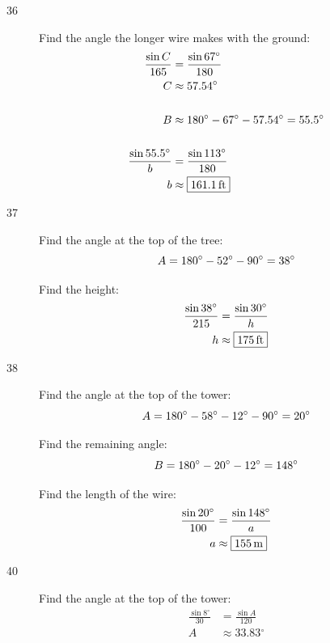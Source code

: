 \documentclass{exam}
\newcommand{\dg}{\ensuremath{^\circ}}
\begin{document}
\begin{description}
      \item[36] 
        Find the angle the longer wire makes with the ground:
        \begin{align*}
          \frac{\sin C}{165} & = \frac{\sin 67 \dg}{180} \\
          C                  & \approx 57.54 \dg \\
          \\
          B & \approx 180 \dg - 67 \dg - 57.54 \dg = 55.5 \dg \\
          \\
          \frac{\sin 55.5 \dg}{b} & = \frac{\sin 113 \dg}{180} \\
          b                       & \approx \boxed{\unit[161.1]{ft}} \\
        \end{align*}

      \item[37] 
        Find the angle at the top of the tree:
        \[
          A = 180 \dg - 52 \dg - 90 \dg = 38 \dg \\
        \]

        Find the height:
        \begin{align*}
          \frac{\sin 38 \dg}{215} & = \frac{\sin 30 \dg}{h} \\
          h                       & \approx \boxed{ \unit[175]{ft} } \\
        \end{align*}

      \item[38] 
        Find the angle at the top of the tower:
        \[
          A = 180 \dg - 58 \dg - 12 \dg - 90 \dg = 20 \dg \\
        \]

        Find the remaining angle:
        \[
          B = 180 \dg - 20 \dg - 12 \dg = 148 \dg \\
        \]

        Find the length of the wire:
        \begin{align*}
          \frac{\sin 20 \dg}{100} & = \frac{\sin 148 \dg}{a} \\
          a                       & \approx \boxed{ \unit[155]{m} } \\
        \end{align*}

      \item[40] 
        Find the angle at the top of the tower:
        \begin{align*}
          \frac{\sin 8 \dg}{30} & = \frac{\sin A}{120} \\
          A                     & \approx 33.83 \dg \\
        \end{align*}


\end{description}
\end{document}
